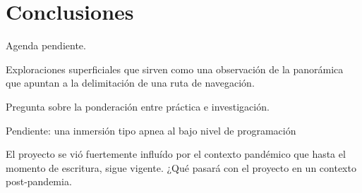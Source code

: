\section*{Conclusiones}

Agenda pendiente.

Exploraciones superficiales que sirven como una observación de la panorámica que apuntan a la delimitación de una ruta de navegación.

Pregunta sobre la ponderación entre práctica e investigación.

Pendiente: una inmersión tipo apnea al bajo nivel de programación

El proyecto se vió fuertemente influído por el contexto pandémico que hasta el momento de escritura, sigue vigente. ¿Qué pasará con el proyecto en un contexto post-pandemia. 
